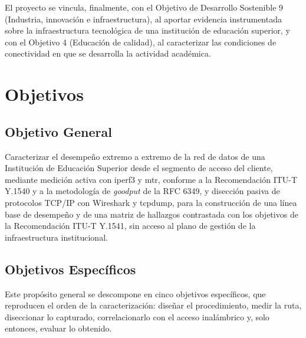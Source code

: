 El proyecto se vincula, finalmente, con el Objetivo de Desarrollo Sostenible 9 (Industria, innovación e infraestructura), al aportar evidencia instrumentada sobre la infraestructura tecnológica de una institución de educación superior, y con el Objetivo 4 (Educación de calidad), al caracterizar las condiciones de conectividad en que se desarrolla la actividad académica.

\section{Objetivos}

\subsection{Objetivo General}

Caracterizar el desempeño extremo a extremo de la red de datos de una Institución de Educación Superior desde el segmento de acceso del cliente, mediante medición activa con iperf3 y mtr, conforme a la Recomendación ITU-T Y.1540 y a la metodología de \textit{goodput} de la RFC 6349, y disección pasiva de protocolos TCP/IP con Wireshark y tcpdump, para la construcción de una línea base de desempeño y de una matriz de hallazgos contrastada con los objetivos de la Recomendación ITU-T Y.1541, sin acceso al plano de gestión de la infraestructura institucional.

\subsection{Objetivos Específicos}

Este propósito general se descompone en cinco objetivos específicos, que reproducen el orden de la caracterización: diseñar el procedimiento, medir la ruta, diseccionar lo capturado, correlacionarlo con el acceso inalámbrico y, solo entonces, evaluar lo obtenido.

